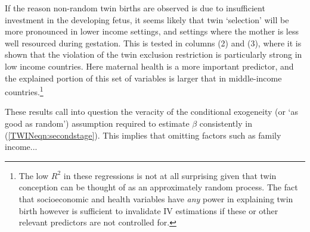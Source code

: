 If the reason non-random twin births are observed is due to insufficient investment 
in the developing fetus, it seems likely that twin `selection' will be more 
pronounced in lower income settings, and settings where the mother is less well 
resourced during gestation.  This is tested in columns (2) and (3), where it is 
shown that the violation of the twin exclusion restriction is particularly strong 
in low income countries.  Here maternal health is a more important predictor, and 
the explained portion of this set of variables is larger that in middle-income 
countries.\footnote{The low $R^2$ in these regressions is not at all surprising 
given that twin conception can be thought of as an approximately random process.
The fact that socioeconomic and health variables have \emph{any} power in 
explaining twin birth however is sufficient to invalidate IV estimations if these 
or other relevant predictors are not controlled for.}

These results call into question the veracity of the conditional exogeneity (or 
`as good as random') assumption required to estimate $\beta$ consistently in 
(\ref{TWINeqn:secondstage}).  This implies that omitting factors such as family 
income...
